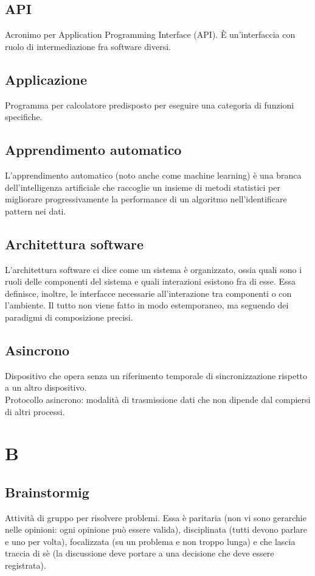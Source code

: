 \subsection{API} Acronimo per Application Programming Interface (API). È un'interfaccia con ruolo di intermediazione fra software diversi.
\subsection{Applicazione} Programma per calcolatore predisposto per eseguire una categoria di funzioni specifiche.
\subsection{Apprendimento automatico} L’apprendimento automatico (noto anche come machine learning) è una branca dell'intelligenza artificiale che raccoglie un insieme di metodi statistici per migliorare progressivamente la performance di un algoritmo nell'identificare pattern nei dati.
\subsection{Architettura software} L’architettura software ci dice come un sistema è organizzato, ossia quali sono i ruoli delle componenti del sistema e quali interazioni esistono fra di esse. Essa definisce, inoltre, le interfacce necessarie all’interazione tra componenti o con l’ambiente. Il tutto non viene fatto in modo estemporaneo, ma seguendo dei paradigmi di composizione precisi.
\subsection{Asincrono} Dispositivo che opera senza un riferimento temporale di sincronizzazione rispetto a un altro dispositivo. \\
Protocollo asincrono: modalità di trasmissione dati che non dipende dal compiersi di altri processi.

\newpage \section{B}
\subsection{Brainstormig} Attività di gruppo per risolvere problemi. Essa è paritaria (non vi sono gerarchie nelle opinioni: ogni opinione può essere valida), disciplinata (tutti devono parlare e uno per volta), focalizzata (su un problema e non troppo lunga) e che lascia traccia di sè (la discussione deve portare a una decisione che deve essere registrata).
